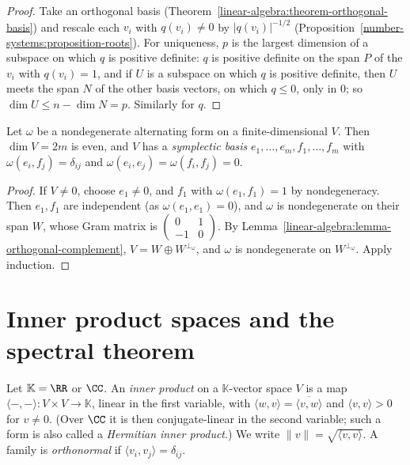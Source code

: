 \begin{proof}
Take an orthogonal basis (Theorem~\ref{linear-algebra:theorem-orthogonal-basis}) and rescale each
$v_i$ with $q(v_i) \neq 0$ by $|q(v_i)|^{-1/2}$ (Proposition~\ref{number-systems:proposition-roots}).
For uniqueness, $p$ is the largest dimension of a subspace on which $q$ is positive definite: $q$ is
positive definite on the span $P$ of the $v_i$ with $q(v_i) = 1$, and if $U$ is a subspace on which $q$ is
positive definite, then $U$ meets the span $N$ of the other basis vectors, on which $q \leq 0$, only in $0$;
so $\dim U \leq n - \dim N = p$. Similarly for $q$.
\end{proof}

\begin{theorem}\label{linear-algebra:theorem-symplectic-basis}
Let $\omega$ be a nondegenerate alternating form on a finite-dimensional $V$. Then $\dim V = 2m$ is even, and $V$
has a \emph{symplectic basis} $e_1, \ldots, e_m, f_1, \ldots, f_m$ with $\omega(e_i, f_j) = \delta_{ij}$ and
$\omega(e_i, e_j) = \omega(f_i, f_j) = 0$.
\end{theorem}

\begin{proof}
If $V \neq 0$, choose $e_1 \neq 0$, and $f_1$ with $\omega(e_1, f_1) = 1$ by nondegeneracy. Then $e_1, f_1$ are
independent (as $\omega(e_1, e_1) = 0$), and $\omega$ is nondegenerate on their span $W$, whose Gram matrix is
$\begin{pmatrix} 0 & 1 \\ -1 & 0 \end{pmatrix}$. By Lemma~\ref{linear-algebra:lemma-orthogonal-complement},
$V = W \oplus W^{\perp_\omega}$, and $\omega$ is nondegenerate on $W^{\perp_\omega}$. Apply induction.
\end{proof}

\section{Inner product spaces and the spectral theorem}\label{linear-algebra:section-inner-product}

\begin{definition}\label{linear-algebra:definition-inner-product}
Let $\mathbb{K} = \RR$ or $\CC$. An \emph{inner product} on a $\mathbb{K}$-vector space $V$ is a map
$\langle -, - \rangle \colon V \times V \to \mathbb{K}$, linear in the first variable, with
$\langle w, v \rangle = \overline{\langle v, w \rangle}$ and $\langle v, v \rangle > 0$ for $v \neq 0$. (Over $\CC$ it is then
conjugate-linear in the second variable; such a form is also called a \emph{Hermitian inner
product}.) We write $\|v\| = \sqrt{\langle v, v \rangle}$. A family is \emph{orthonormal} if
$\langle v_i, v_j \rangle = \delta_{ij}$.
\end{definition}

